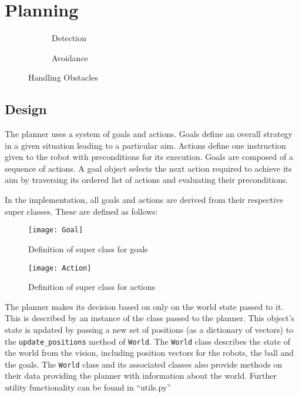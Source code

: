 \section{Planning}
\lstset{language=Python, showstringspaces=false}


\begin{figure}[H]
\centering
\begin{subfigure}{.5\textwidth}
\centering

\caption{Detection}
\label{fig:obstacle_detection}
\end{subfigure}%
\begin{subfigure}{.5\textwidth}
\centering

\caption{Avoidance}
\label{fig:obstacle_avoidance}
\end{subfigure}
\caption{Handling Obstacles}
\label{handling_obstacle}
\end{figure}



\subsection{Design}

The planner uses a system of goals and actions. Goals define an overall strategy in a given situation leading to a particular aim. Actions define one instruction given to the robot with preconditions for its execution. Goals are composed of a sequence of actions. A goal object selects the next action required to achieve its aim by traversing its ordered list of actions and evaluating their preconditions.

In the implementation, all goals and actions are derived from their respective super classes. These are defined as follows:

\begin{figure}[p]
	\begin{center}
          \texttt{[image: Goal]}
          \caption{Definition of super class for goals}
	\end{center}
\end{figure}


\begin{figure}[p]
	\begin{center}
          \texttt{[image: Action]}
          \caption{Definition of super class for actions}
	\end{center}
\end{figure}


The planner makes its decision based on only on the world state passed to it. This is described by an instance of the  class passed to the planner. This object's state is updated by passing a new set of positions (as a dictionary of vectors) to the \texttt{update\_positions} method of \texttt{World}. The \texttt{World} class describes the state of the world from the vision, including position vectors for the robots, the ball and the goals. The \texttt{World} class and its associated classes also provide methods on their data providing the planner with information about the world. Further utility functionality can be found in ``utils.py''

